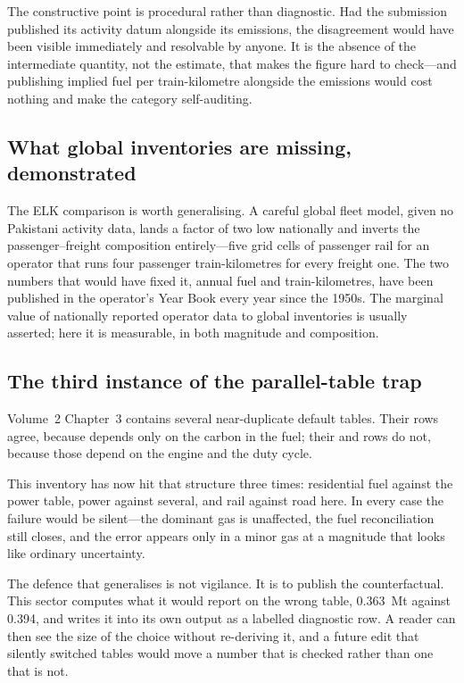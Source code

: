 The constructive point is procedural rather than diagnostic. Had the submission published its
activity datum alongside its emissions, the disagreement would have been visible immediately
and resolvable by anyone. It is the absence of the intermediate quantity, not the estimate,
that makes the figure hard to check---and publishing implied fuel per train-kilometre alongside
the emissions would cost nothing and make the category self-auditing.

\subsection{What global inventories are missing, demonstrated}

The ELK comparison is worth generalising. A careful global fleet model, given no Pakistani
activity data, lands a factor of two low nationally and inverts the passenger--freight
composition entirely---five grid cells of passenger rail for an operator that runs four
passenger train-kilometres for every freight one. The two numbers that would have fixed it,
annual fuel and train-kilometres, have been published in the operator's Year Book every
year since the 1950s. The marginal value of nationally reported operator data to global
inventories is usually asserted; here it is measurable, in both magnitude and composition.

\subsection{The third instance of the parallel-table trap}

Volume~2 Chapter~3 contains several near-duplicate default tables. Their \COtwo{} rows agree,
because \COtwo{} depends only on the carbon in the fuel; their \CHfour{} and \NtwoO{} rows do
not, because those depend on the engine and the duty cycle.

This inventory has now hit that structure three times: residential fuel against the power
table, power against several, and rail against road here. In every case the failure would be
silent---the dominant gas is unaffected, the fuel reconciliation still closes, and the error
appears only in a minor gas at a magnitude that looks like ordinary uncertainty.

The defence that generalises is not vigilance. It is to publish the counterfactual. This sector
computes what it would report on the wrong table, \SI{0.363}{\mega\tonne} against
\SI{0.394}{}, and writes it into its own output as a labelled diagnostic row. A reader can then
see the size of the choice without re-deriving it, and a future edit that silently switched
tables would move a number that is checked rather than one that is not.

